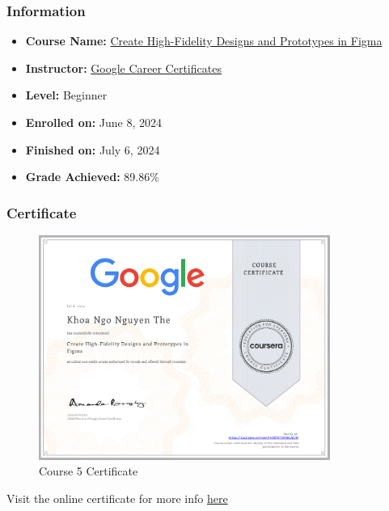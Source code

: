 \subsubsection{Information}
\begin{itemize}
	\item \textbf{Course Name:} \href{https://www.coursera.org/learn/high-fidelity-designs-prototype}{Create High-Fidelity Designs and Prototypes in Figma}
	\item \textbf{Instructor:} \href{https://www.coursera.org/instructor/google-career-certificates}{Google Career Certificates}
	\item \textbf{Level:} Beginner
	\item \textbf{Enrolled on:} June 8, 2024
	\item \textbf{Finished on:} July 6, 2024
	\item \textbf{Grade Achieved:} 89.86\%
\end{itemize}

\subsubsection{Certificate}
\begin{flushleft}
	\begin{figure}[!ht]
		\centering
		\includegraphics[width=0.85\textwidth]{imgs/Course5.png}
		\caption{Course 5 Certificate}
	\end{figure}

	Visit the online certificate for more info \href{https://www.coursera.org/account/accomplishments/verify/RQV73K9KLNCW}{here}
\end{flushleft}

